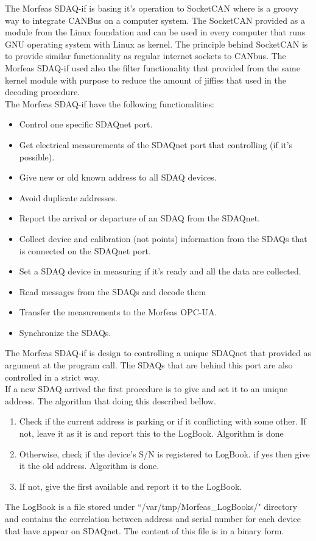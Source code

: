 \documentclass{article}
\begin{document}
The Morfeas SDAQ-if is basing it's operation to SocketCAN where is a groovy way to integrate CANBus on a computer system. The SocketCAN provided as a module from the Linux
foundation and can be used in every computer that runs GNU operating system with Linux as kernel. The principle behind SocketCAN is to provide similar functionality as regular internet sockets to CANbus.
The Morfeas SDAQ-if used also the filter functionality that provided from the same kernel module with purpose to reduce the amount of jiffies that used in the decoding procedure.\\
The Morfeas SDAQ-if have the following functionalities:
\begin{itemize}
	\item Control one specific SDAQnet port.
	\item Get electrical measurements of the SDAQnet port that controlling (if it's possible).
	\item Give new or old known address to all SDAQ devices.
	\item Avoid duplicate addresses.
	\item Report the arrival or departure of an SDAQ from the SDAQnet.
	\item Collect device and calibration (not points) information from the SDAQs that is connected on the SDAQnet port.
	\item Set a SDAQ device in measuring if it's ready and all the data are collected.
	\item Read messages from the SDAQs and decode them
	\item Transfer the measurements to the Morfeas OPC-UA.
	\item Synchronize the SDAQs.
\end{itemize}
The Morfeas SDAQ-if is design to controlling a unique SDAQnet that provided as argument at the program call. The SDAQs that are behind this port are also controlled in a strict way.\\
If a new SDAQ arrived the first procedure is to give and set it to an unique address. The algorithm that doing this described bellow.
\begin{enumerate}
	\item Check if the current address is parking or if it conflicting with some other. If not, leave it as it is and report this to the LogBook. Algorithm is done
	\item Otherwise, check if the device's S/N is registered to LogBook. if yes then give it the old address. Algorithm is done.
	\item If not, give the first available and report it to the LogBook.
\end{enumerate}
The LogBook is a file stored under ``/var/tmp/Morfeas\_LogBooks/" directory and contains the correlation between address and serial number for each device that have appear on SDAQnet.
The content of this file is in a binary form.
\end{document}
